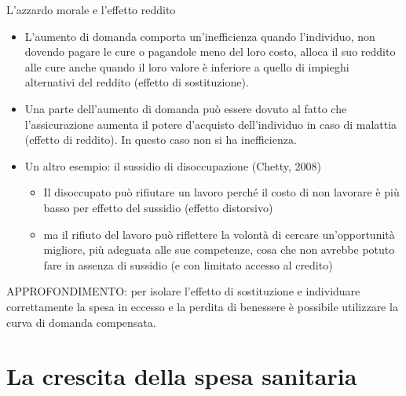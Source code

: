 \documentclass[aspectratio=64,11pt]{beamer}
\begin{document}
\begin{frame}{L'azzardo morale e l'effetto reddito}
\begin{itemize}
\item L'aumento di domanda comporta un'inefficienza quando l'individuo, non
dovendo pagare le cure o pagandole meno del loro costo, alloca il suo
reddito alle cure anche quando il loro valore è inferiore a quello di
impieghi alternativi del reddito (\alert{effetto di sostituzione}).
\item Una parte dell'aumento di domanda può essere dovuto al fatto che
l'assicurazione aumenta il potere d'acquisto dell'individuo in caso di
malattia (\alert{effetto di reddito}). In questo caso non si ha inefficienza.
\item Un altro esempio: il sussidio di disoccupazione (Chetty, 2008)
\begin{itemize}
\item Il disoccupato può rifiutare un lavoro perché il costo di non lavorare è
più basso per effetto del sussidio (effetto distorsivo)
\item ma il rifiuto del lavoro può riflettere la volontà di cercare
un'opportunità migliore, più adeguata alle sue competenze, cosa che non
avrebbe potuto fare in assenza di sussidio (e con limitato accesso al
credito)
\end{itemize}
\end{itemize}

\begin{block}{}
APPROFONDIMENTO: per isolare l'effetto di sostituzione e individuare correttamente
la spesa in eccesso e la perdita di benessere è possibile utilizzare la \alert{curva di domanda compensata}.
\end{block}
\end{frame}

\section{La crescita della spesa sanitaria}
\end{document}
